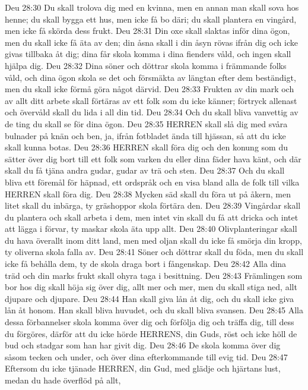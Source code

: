 Deu 28:30  Du skall trolova dig med en kvinna, men en annan man skall sova hos henne; du skall bygga ett hus, men icke få bo däri; du skall plantera en vingård, men icke få skörda dess frukt.
Deu 28:31  Din oxe skall slaktas inför dina ögon, men du skall icke få äta av den; din åsna skall i din åsyn rövas ifrån dig och icke givas tillbaka åt dig; dina får skola komma i dina fienders våld, och ingen skall hjälpa dig.
Deu 28:32  Dina söner och döttrar skola komma i främmande folks våld, och dina ögon skola se det och försmäkta av längtan efter dem beständigt, men du skall icke förmå göra något därvid.
Deu 28:33  Frukten av din mark och av allt ditt arbete skall förtäras av ett folk som du icke känner; förtryck allenast och övervåld skall du lida i all din tid.
Deu 28:34  Och du skall bliva vanvettig av de ting du skall se för dina ögon.
Deu 28:35  HERREN skall slå dig med svåra bulnader på knän och ben, ja, ifrån fotbladet ända till hjässan, så att du icke skall kunna botas.
Deu 28:36  HERREN skall föra dig och den konung som du sätter över dig bort till ett folk som varken du eller dina fäder hava känt, och där skall du få tjäna andra gudar, gudar av trä och sten.
Deu 28:37  Och du skall bliva ett föremål för häpnad, ett ordspråk och en visa bland alla de folk till vilka HERREN skall föra dig.
Deu 28:38  Mycken säd skall du föra ut på åkern, men litet skall du inbärga, ty gräshoppor skola förtära den.
Deu 28:39  Vingårdar skall du plantera och skall arbeta i dem, men intet vin skall du få att dricka och intet att lägga i förvar, ty maskar skola äta upp allt.
Deu 28:40  Olivplanteringar skall du hava överallt inom ditt land, men med oljan skall du icke få smörja din kropp, ty oliverna skola falla av.
Deu 28:41  Söner och döttrar skall du föda, men du skall icke få behålla dem, ty de skola draga bort i fångenskap.
Deu 28:42  Alla dina träd och din marks frukt skall ohyra taga i besittning.
Deu 28:43  Främlingen som bor hos dig skall höja sig över dig, allt mer och mer, men du skall stiga ned, allt djupare och djupare.
Deu 28:44  Han skall giva lån åt dig, och du skall icke giva lån åt honom. Han skall bliva huvudet, och du skall bliva svansen.
Deu 28:45  Alla dessa förbannelser skola komma över dig och förfölja dig och träffa dig, till dess du förgöres, därför att du icke hörde HERRENS, din Guds, röst och icke höll de bud och stadgar som han har givit dig.
Deu 28:46  De skola komma över dig såsom tecken och under, och över dina efterkommande till evig tid.
Deu 28:47  Eftersom du icke tjänade HERREN, din Gud, med glädje och hjärtans lust, medan du hade överflöd på allt,
